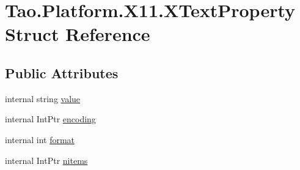 \hypertarget{struct_tao_1_1_platform_1_1_x11_1_1_x_text_property}{
\section{Tao.Platform.X11.XTextProperty Struct Reference}
\label{struct_tao_1_1_platform_1_1_x11_1_1_x_text_property}
}
\subsection*{Public Attributes}
\begin{DoxyCompactItemize}
\item 
internal string \hyperlink{struct_tao_1_1_platform_1_1_x11_1_1_x_text_property_a745d92c8bfbc59e4b11f9aa4d906069c}{value}
\item 
internal IntPtr \hyperlink{struct_tao_1_1_platform_1_1_x11_1_1_x_text_property_ae2342a13abe7e01e61b77aa9bf0887d1}{encoding}
\item 
internal int \hyperlink{struct_tao_1_1_platform_1_1_x11_1_1_x_text_property_a0cc09212f26caf24e5fe37583432e04a}{format}
\item 
internal IntPtr \hyperlink{struct_tao_1_1_platform_1_1_x11_1_1_x_text_property_a00039dffc5c1ca02e0683bb103818730}{nitems}
\end{DoxyCompactItemize}


